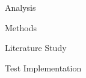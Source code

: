 \documentclass{matthijs}
\begin{document}
\begin{hoofdstuk}{Analysis}
\begin{paragraaf}{Methods}
\begin{subparagraaf}{Literature Study}
				\vspace{2ex}
					\centerline{}
			
			\end{subparagraaf}

			\begin{subparagraaf}{Test Implementation}

				\setlength\parindent{1.5em}
				\setlength{\parskip}{0.5em plus 0.2em minus 0.1em}
				\linespread{1.2}
				

\end{subparagraaf}
\end{paragraaf}
\end{hoofdstuk}
\end{document}

